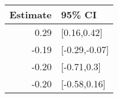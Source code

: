 \begin{tabular}{rl}
  \hline
Estimate & 95\% CI \\ 
  \hline
0.29 & [0.16,0.42] \\ 
  -0.19 & [-0.29,-0.07] \\ 
  -0.20 & [-0.71,0.3] \\ 
  -0.20 & [-0.58,0.16] \\ 
   \hline
\end{tabular}

